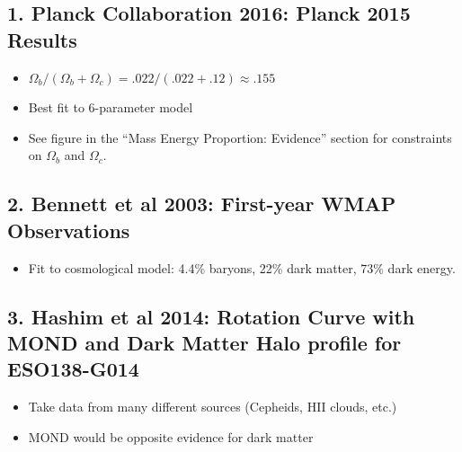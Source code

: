 \documentclass{article}
\begin{document}
\subsection*{1. Planck Collaboration 2016: Planck 2015 Results}
\begin{itemize}
\item $\Omega_b/(\Omega_b+\Omega_c)=.022/(.022+.12)\approx.155$
\item Best fit to 6-parameter model
\item See figure in the ``Mass Energy Proportion: Evidence'' section for constraints on $\Omega_b$ and $\Omega_c$.
\end{itemize}

\subsection*{2. Bennett et al 2003: First-year WMAP Observations}
\begin{itemize}
\item Fit to cosmological model: 4.4\% baryons, 22\% dark matter, 73\% dark energy.
\end{itemize}

\subsection*{3. Hashim et al 2014: Rotation Curve with MOND and Dark Matter Halo profile for ESO138-G014}
\begin{itemize}
\item Take data from many different sources (Cepheids, HII clouds, etc.) 
\item MOND would be opposite evidence for dark matter
\end{itemize}
\end{document}
